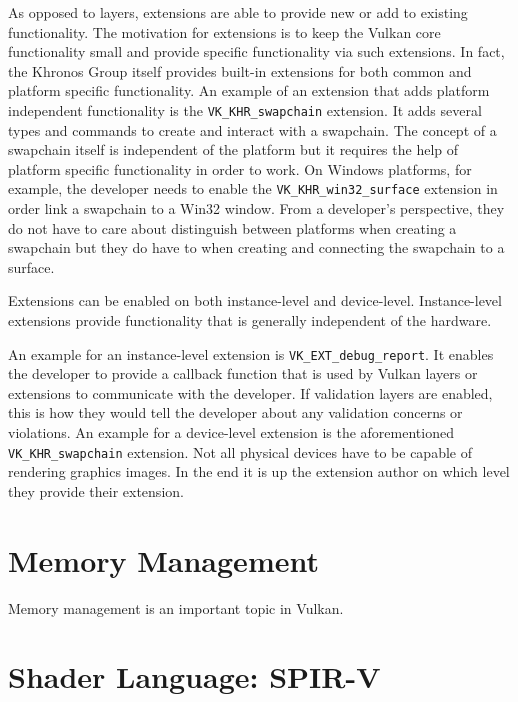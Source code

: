     As opposed to layers, extensions are able to provide new or add to existing functionality. The motivation for extensions is to keep the Vulkan core functionality small and provide specific functionality via such extensions. In fact, the Khronos Group itself provides built-in extensions for both common and platform specific functionality. An example of an extension that adds platform independent functionality is the \lstinline{VK_KHR_swapchain} extension. It adds several types and commands to create and interact with a swapchain. The concept of a swapchain itself is independent of the platform but it requires the help of platform specific functionality in order to work. On Windows platforms, for example, the developer needs to enable the \lstinline{VK_KHR_win32_surface} extension in order link a swapchain to a Win32 window. From a developer's perspective, they do not have to care about distinguish between platforms when creating a swapchain but they do have to when creating and connecting the swapchain to a surface.

    Extensions can be enabled on both instance-level and device-level. Instance-level extensions provide functionality that is generally independent of the hardware.

    An example for an instance-level extension is \lstinline{VK_EXT_debug_report}. It enables the developer to provide a callback function that is used by Vulkan layers or extensions to communicate with the developer. If validation layers are enabled, this is how they would tell the developer about any validation concerns or violations. An example for a device-level extension is the aforementioned \lstinline{VK_KHR_swapchain} extension. Not all physical devices have to be capable of rendering graphics images. In the end it is up the extension author on which level they provide their extension.

  \section{Memory Management}
  \label{sec:MemoryManagement}

    Memory management is an important topic in Vulkan.

    \lipsum

  \section{Shader Language: SPIR-V}

